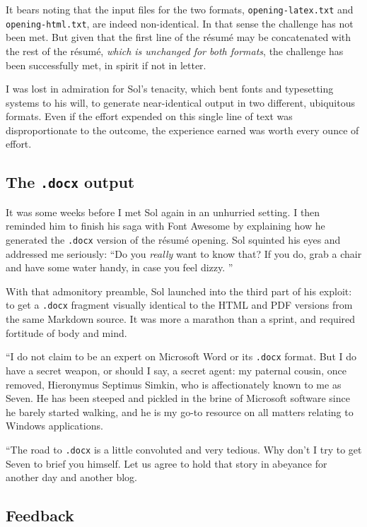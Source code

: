 \documentclass[
  british,
  a4paper,
  rgb,
  dvipsnames,
  svgnames,
  hyphens]{article}
\begin{document}
It bears noting that the input files for the two formats,
\texttt{opening-latex.txt} and \texttt{opening-html.txt}, are indeed
non-identical. In that sense the challenge has not been met. But given
that the first line of the résumé may be concatenated with the rest of
the résumé, \emph{which is unchanged for both formats}, the challenge
has been successfully met, in spirit if not in letter.

I was lost in admiration for Sol's tenacity, which bent fonts and
typesetting systems to his will, to generate near-identical output in
two different, ubiquitous formats. Even if the effort expended on this
single line of text was disproportionate to the outcome, the experience
earned was worth every ounce of effort.

\hypertarget{the-.docx-output}{%
\subsection{\texorpdfstring{The \texttt{.docx}
output}{The .docx output}}\label{the-.docx-output}}

It was some weeks before I met Sol again in an unhurried setting. I then
reminded him to finish his saga with Font Awesome by explaining how he
generated the \texttt{.docx} version of the résumé opening. Sol squinted
his eyes and addressed me seriously: ``Do you \emph{really} want to know
that? If you do, grab a chair and have some water handy, in case you
feel dizzy.  \normalfont''

With that admonitory preamble, Sol launched into the third part of his
exploit: to get a \texttt{.docx} fragment visually identical to the HTML
and PDF versions from the same Markdown source. It was more a marathon
than a sprint, and required fortitude of body and mind.

``I do not claim to be an expert on Microsoft Word or its \texttt{.docx}
format. But I do have a secret weapon, or should I say, a secret agent:
my paternal cousin, once removed, Hieronymus Septimus Simkin, who is
affectionately known to me as Seven. He has been steeped and pickled in
the brine of Microsoft software since he barely started walking, and he
is my go-to resource on all matters relating to Windows applications.

``The road to \texttt{.docx} is a little convoluted and very tedious.
Why don't I try to get Seven to brief you himself. Let us agree to hold
that story in abeyance for another day and another blog.

\hypertarget{feedback}{%
\subsection{Feedback}\label{feedback}}
\end{document}
